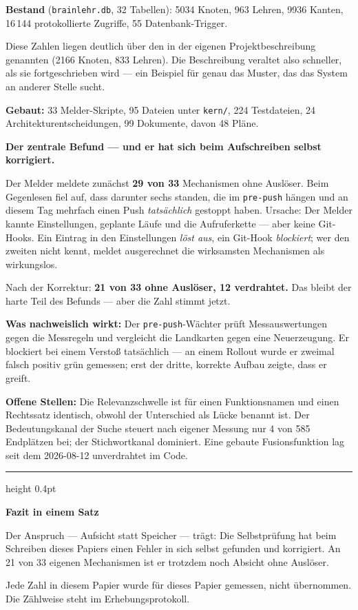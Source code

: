 \documentclass[11pt,a4paper]{article}
\begin{document}
\textbf{Bestand} (\texttt{brainlehr.db}, 32 Tabellen): 5034 Knoten, 963 Lehren,
9936 Kanten, 16\,144 protokollierte Zugriffe, 55 Datenbank-Trigger.

Diese Zahlen liegen deutlich über den in der eigenen Projektbeschreibung
genannten (2166 Knoten, 833 Lehren). Die Beschreibung veraltet also schneller,
als sie fortgeschrieben wird --- ein Beispiel für genau das Muster, das das
System an anderer Stelle sucht.

\textbf{Gebaut:} 33 Melder-Skripte, 95 Dateien unter \texttt{kern/},
224 Testdateien, 24 Architekturentscheidungen, 99 Dokumente, davon 48 Pläne.

\begin{befund}
\textbf{Der zentrale Befund --- und er hat sich beim Aufschreiben selbst
korrigiert.}

Der Melder meldete zunächst \textbf{29 von 33} Mechanismen ohne Auslöser. Beim
Gegenlesen fiel auf, dass darunter sechs standen, die im \texttt{pre-push}
hängen und an diesem Tag mehrfach einen Push \emph{tatsächlich} gestoppt haben.
Ursache: Der Melder kannte Einstellungen, geplante Läufe und die Aufruferkette
--- aber keine Git-Hooks. Ein Eintrag in den Einstellungen \emph{löst aus}, ein
Git-Hook \emph{blockiert}; wer den zweiten nicht kennt, meldet ausgerechnet die
wirksamsten Mechanismen als wirkungslos.

Nach der Korrektur: \textbf{21 von 33 ohne Auslöser, 12 verdrahtet.} Das bleibt
der harte Teil des Befunds --- aber die Zahl stimmt jetzt.
\end{befund}

\textbf{Was nachweislich wirkt:} Der \texttt{pre-push}-Wächter prüft
Messauswertungen gegen die Messregeln und vergleicht die Landkarten gegen eine
Neuerzeugung. Er blockiert bei einem Verstoß tatsächlich --- an einem
Rollout wurde er zweimal falsch positiv grün gemessen; erst der dritte, korrekte
Aufbau zeigte, dass er greift.

\textbf{Offene Stellen:} Die Relevanzschwelle ist für einen Funktionsnamen und
einen Rechtssatz identisch, obwohl der Unterschied als Lücke benannt ist. Der
Bedeutungskanal der Suche steuert nach eigener Messung nur 4 von 585 Endplätzen
bei; der Stichwortkanal dominiert. Eine gebaute Fusionsfunktion lag seit dem
2026-08-12 unverdrahtet im Code.

\vspace{10pt}
\hrule height 0.4pt
\vspace{10pt}

{\displayfont\normalsize\color{tiefblau}\textbf{Fazit in einem Satz}}

Der Anspruch --- Aufsicht statt Speicher --- trägt: Die Selbstprüfung hat beim
Schreiben dieses Papiers einen Fehler in sich selbst gefunden und korrigiert. An
21 von 33 eigenen Mechanismen ist er trotzdem noch Absicht ohne Auslöser.

\vspace{16pt}
{\displayfont\footnotesize\color{grau}
Jede Zahl in diesem Papier wurde für dieses Papier gemessen, nicht übernommen.
Die Zählweise steht im Erhebungsprotokoll.\par}
\end{document}
